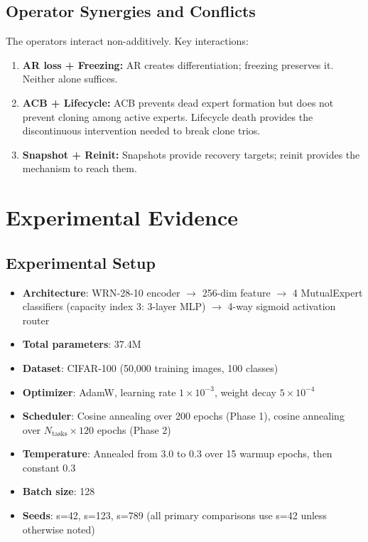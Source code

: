 \documentclass[twoside]{article}
\theoremstyle{definition}
\begin{document}
\subsection{Operator Synergies and Conflicts}

The operators interact non-additively. Key interactions:

\begin{enumerate}
    \item \textbf{AR loss + Freezing:} AR creates differentiation; freezing preserves it. Neither alone suffices.
    \item \textbf{ACB + Lifecycle:} ACB prevents dead expert formation but does not prevent cloning among active experts. Lifecycle death provides the discontinuous intervention needed to break clone trios.
    \item \textbf{Snapshot + Reinit:} Snapshots provide recovery targets; reinit provides the mechanism to reach them.
\end{enumerate}

\section{Experimental Evidence}

\subsection{Experimental Setup}

\begin{itemize}
    \item \textbf{Architecture}: WRN-28-10 encoder $\to$ 256-dim feature $\to$ 4 MutualExpert classifiers (capacity index 3: 3-layer MLP) $\to$ 4-way sigmoid activation router
    \item \textbf{Total parameters}: 37.4M
    \item \textbf{Dataset}: CIFAR-100 (50,000 training images, 100 classes)
    \item \textbf{Optimizer}: AdamW, learning rate $1\times 10^{-3}$, weight decay $5\times 10^{-4}$
    \item \textbf{Scheduler}: Cosine annealing over 200 epochs (Phase 1), cosine annealing over $N_{\text{tasks}} \times 120$ epochs (Phase 2)
    \item \textbf{Temperature}: Annealed from 3.0 to 0.3 over 15 warmup epochs, then constant 0.3
    \item \textbf{Batch size}: 128
    \item \textbf{Seeds}: s=42, s=123, s=789 (all primary comparisons use s=42 unless otherwise noted)
\end{itemize}
\end{document}
